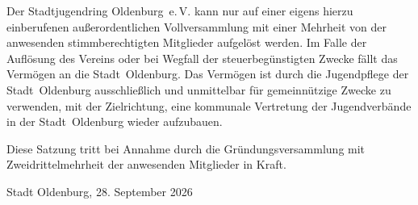 \documentclass[10pt,a4paper,oneside,parskip=half]{scrartcl}
\begin{document}
\begin{contract}
Der Stadtjugendring Oldenburg~e.\,V. kann nur auf einer eigens hierzu einberufenen außerordentlichen Vollversammlung mit einer Mehrheit von  der anwesenden stimmberechtigten Mitglieder aufgelöst werden.
Im Falle der Auflösung des Vereins oder bei Wegfall der steuerbegünstigten Zwecke fällt das Vermögen an die Stadt~Oldenburg. Das Vermögen ist durch die Jugendpflege der Stadt~Oldenburg ausschließlich und unmittelbar für gemeinnützige Zwecke zu verwenden, mit der Zielrichtung, eine kommunale Vertretung der Jugendverbände in der Stadt~Oldenburg wieder aufzubauen.

Diese Satzung tritt bei Annahme durch die Gründungsversammlung mit Zweidrittelmehrheit der anwesenden Mitglieder in Kraft.

\end{contract}
\vspace{1cm}
Stadt Oldenburg, 28. September 2026
\end{document}
